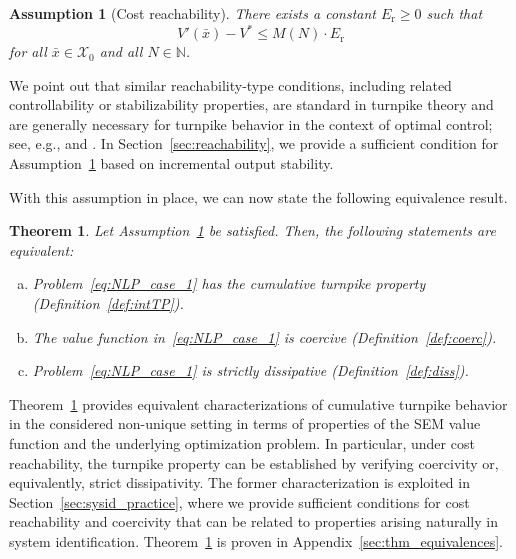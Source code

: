 \documentclass[a4paper,fleqn]{cas-dc}
\newtheorem{ass}{Assumption}
\newtheorem{thm}{Theorem}
\begin{document}
\begin{ass}[Cost reachability]\label{ass:reachability}
	There exists a constant $E_\mathrm{r}\geq0$ such that
	\begin{equation}\label{eq:reachability}
		V'(\bar{x}) - V^* \leq M(N)\cdot E_\mathrm{r}
	\end{equation}
	for all $\bar{x}\in\mathcal{X}_0$ and all $N\in\mathbb{N}$.
\end{ass}

We point out that similar reachability-type conditions, including related controllability or stabilizability properties, are standard in turnpike theory and are generally necessary for turnpike behavior in the context of optimal control; see, e.g., \cite[Th.~4.7]{Gruene2016a} and \cite[Ass.~1]{Gruene2018}.
In Section~\ref{sec:reachability}, we provide a sufficient condition for Assumption~\ref{ass:reachability} based on incremental output stability.

With this assumption in place, we can now state the following equivalence result.

\begin{thm}\label{thm:equivalences}
	Let Assumption~\ref{ass:reachability} be satisfied. Then, the following statements are equivalent:
	\begin{enumerate}[a)]
		\item Problem~\eqref{eq:NLP_case_1} has the cumulative turnpike property (Definition~\ref{def:intTP}).
		\item The value function in~\eqref{eq:NLP_case_1} is coercive (Definition~\ref{def:coerc}).
		\item Problem~\eqref{eq:NLP_case_1} is strictly dissipative (Definition~\ref{def:diss}).
	\end{enumerate}
\end{thm}

Theorem~\ref{thm:equivalences} provides equivalent characterizations of cumulative turnpike behavior in the considered non-unique setting in terms of properties of the SEM value function and the underlying optimization problem.
In particular, under cost reachability, the turnpike property can be established by verifying coercivity or, equivalently, strict dissipativity. The former characterization is exploited in Section~\ref{sec:sysid_practice}, where we provide sufficient conditions for cost reachability and coercivity that can be related to properties arising naturally in system identification. Theorem~\ref{thm:equivalences} is proven in Appendix~\ref{sec:thm_equivalences}.
\end{document}
